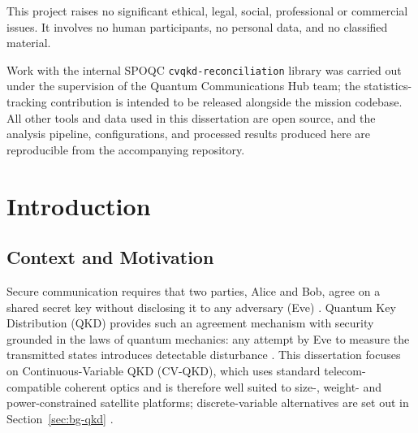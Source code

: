 \documentclass{UoYCSproject}
\begin{document}
\begin{ethics}
This project raises no significant ethical, legal, social, professional or
commercial issues. It involves no human participants, no personal data, and
no classified material. 

Work with the internal SPOQC \texttt{cvqkd-reconciliation}
library was carried out under the supervision of the Quantum Communications
Hub team; the statistics-tracking contribution is intended to be released 
alongside the mission codebase. All other tools and
data used in this dissertation are open source, and the analysis pipeline,
configurations, and processed results produced here are reproducible from
the accompanying repository.
\end{ethics}

\chapter{Introduction}
\label{cha:Introduction}

\section{Context and Motivation}
\label{sec:intro-context}

Secure communication requires that two parties, Alice and Bob, agree on a
shared secret key without disclosing it to any adversary (Eve)
\cite{mackay_information_nodate}. Quantum Key Distribution (QKD) provides
such an agreement mechanism with security grounded in the laws of quantum
mechanics: any attempt by Eve to measure the transmitted states introduces
detectable disturbance \cite{grosshans_continuous_2002}. This dissertation
focuses on Continuous-Variable QKD (CV-QKD), which uses standard
telecom-compatible coherent optics and is therefore well suited to
size-, weight- and power-constrained satellite platforms; discrete-variable
alternatives are set out in Section~\ref{sec:bg-qkd}
\cite{laudenbach_continuous-variable_2018}.
\end{document}
